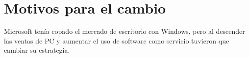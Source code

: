 \section{Motivos para el cambio}
Microsoft tenía copado el mercado de escritorio con Windows, pero al descender las ventas de PC y aumentar el uso de software como servicio tuvieron que cambiar su estrategia. 